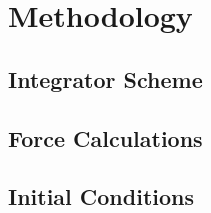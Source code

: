 \section{Methodology}
{ \lipsum[7] }

\subsection{Integrator Scheme}

{ \lipsum[2-4] }

\subsection{Force Calculations}

{ \lipsum[5] }

\subsection{Initial Conditions}

{ \lipsum[10] }
